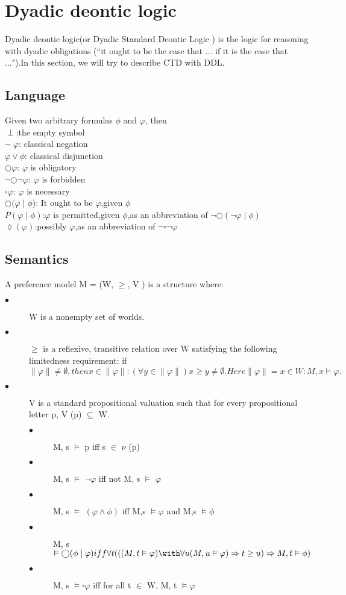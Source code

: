 \documentclass{article}
\begin{document}
\section{Dyadic deontic logic}
Dyadic deontic logic(or Dyadic Standard Deontic Logic ) is the logic for reasoning with dyadic obligations (“it ought to be the case that ... if it is the case that ...").In this section, we will try to describe CTD with DDL.
\subsection{Language}
Given two arbitrary formulas $\phi$  and $\varphi$, then\\
$\perp$:the empty symbol\\
$\neg$ $\varphi$: classical negation\\
$\varphi \vee  \phi $: classical disjunction\\
$\bigcirc \varphi $: $\varphi$ is obligatory\\
$ \neg \bigcirc\neg\varphi$: $ \varphi$ is forbidden\\
$ \square\varphi$: $\varphi$ is necessary\\
$\bigcirc(\varphi\mid\phi$): It ought to be $\varphi$,given $\phi$\\
$P(\varphi\mid\phi) $:$\varphi$ is permitted,given $\phi$,as an abbreviation of $\neg\bigcirc(\neg\varphi\mid\phi)$\\
$\lozenge(\varphi)$:possibly $\varphi$,as an abbreviation of $\neg\square\neg\varphi$
\subsection{Semantics}
A preference model M = (W, $\geq$, V ) is a structure where:
\begin{description}
\item[$\bullet$ ] W is a nonempty set of worlds.
\item[$\bullet $] $ \geq$ is a reflexive, transitive relation over W satisfying the following limitedness requirement: if $\|\varphi\| \neq \emptyset, then {x\in\|\varphi\| : (\forall y \in \|\varphi\|)x\geq y} \neq \emptyset. Here\|\varphi\| = {x \in W : M, x\vDash \varphi}.$
\item[$\bullet$]V is a standard propositional valuation such that for every propositional letter p, V (p) $\subseteq$ W.
\begin{description}
\item[$\bullet$ ]M, s $ \vDash $ p iff s $\in$ $\nu$  (p)
\item[$\bullet$ ]M, s $ \vDash $ $\neg \varphi$ iff not M, s $ \vDash $ $\varphi$
\item[$\bullet$ ]M, s $ \vDash $ $(\varphi\land\phi )$ iff M,s $ \vDash \varphi$ and  M,s $ \vDash \phi$
\item[$\bullet$ ]M, s $ \vDash  \bigcirc(\phi\mid\varphi) iff \forall t(((M, t \vDash \varphi)\with\forall u(M, u \vDash \varphi) \Rightarrow t \geq u) \Rightarrow M, t \vDash \phi)$
\item[$\bullet$ ]M, s $ \vDash  \square\varphi$ iff for all t $\in$ W, M, t $\vDash \varphi$
\end{description}
\end{description}
\end{document}
